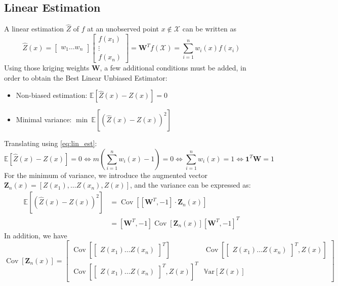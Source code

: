 \documentclass[a4paper,11pt]{article}
\newcommand{\Var}{\mathbb{V}\text{ar}}
\newcommand{\Ex}{\mathbb{E}}
\DeclareMathOperator{\Cov}{\mathrm{Cov}}
\theoremstyle{defi}
\numberwithin{thmCounter}{section}
\begin{document}
\subsection{Linear Estimation}
\label{sec:linear_estimation}
A linear estimation $\hat{Z}$ of $f$ at an unobserved point $x\notin \mathcal{X}$ can be written as
\begin{equation}
  \label{eq:lin_est}
  \hat{Z}(x) =
  \begin{bmatrix}
    w_1 \dots w_n
    \end{bmatrix}
    \begin{bmatrix}
      f(x_1) \\ \vdots \\ f(x_n)
    \end{bmatrix} = \mathbf{W}^Tf(\mathcal{X}) = \sum_{i=1}^n w_i(x) f(x_i)
\end{equation}
Using those kriging weights $\mathbf{W}$, a few additional conditions must be added, in order to obtain the Best Linear Unbiased Estimator:
\begin{itemize}
\item Non-biased estimation: $\Ex[\hat{Z}(x) - Z(x)]=0$
\item Minimal variance: $\min~\Ex[(\hat{Z}(x) - Z(x))^2]$
\end{itemize}
Translating using \cref{eq:lin_est}:
\begin{equation}
  \Ex[\hat{Z}(x) - Z(x)]=0 \iff m(\sum_{i=1}^n w_i(x)-1) = 0 \iff \sum_{i=1}^n w_i(x) = 1 \iff \mathbf{1}^T \mathbf{W} = 1
\end{equation}
For the minimum of variance, we introduce the augmented vector $\mathbf{Z}_n(x) = [Z(x_1),\dots Z(x_n), Z(x)]$, and
the variance can be expressed as:
\begin{align}
  \Ex[(\hat{Z}(x) - Z(x))^2] &= \Cov\left[[\mathbf{W}^T, -1] \cdot \mathbf{Z}_n(x) \right] \\
                             &= [\mathbf{W}^T, -1] \Cov\left[\mathbf{Z}_n(x) \right] [\mathbf{W}^T, -1]^T
\end{align}
In addition, we have
\begin{equation}
  \Cov\left[\mathbf{Z}_n(x) \right] =
  \begin{bmatrix}
    \Cov\left[
      \begin{bmatrix}
        Z(x_1) \dots Z(x_n)
      \end{bmatrix}^T\right]
    & \Cov\left[
      \begin{bmatrix}
        Z(x_1) \dots Z(x_n)
      \end{bmatrix}^T, Z(x) \right]
  \\
  \Cov\left[
    \begin{bmatrix}
      Z(x_1) \dots Z(x_n)
    \end{bmatrix}^T, Z(x) \right]^T & \Var\left[Z(x)\right]
  \end{bmatrix}
\end{equation}
\end{document}
